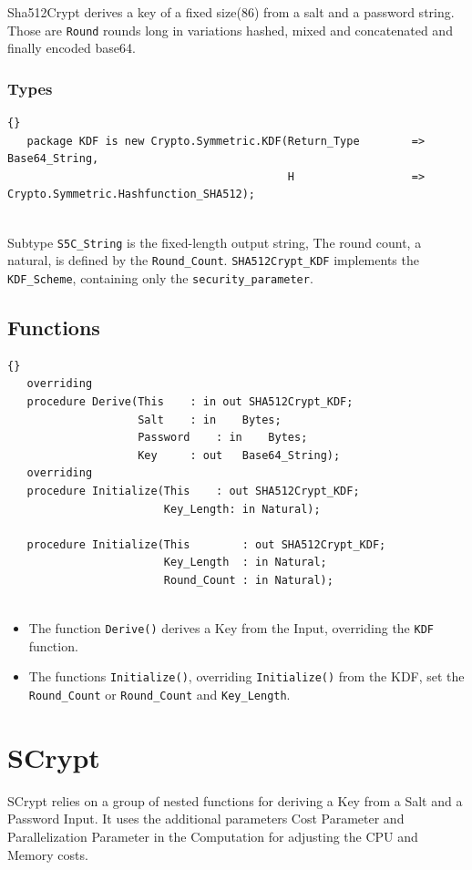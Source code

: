 Sha512Crypt derives a key of a fixed size(86) from a salt and a password string. Those are \texttt{Round\Count} rounds long in variations hashed, mixed and concatenated and finally encoded base64.
\subsubsection*{Types}
\begin{lstlisting}{}
   package KDF is new Crypto.Symmetric.KDF(Return_Type        => Base64_String,
                                           H                  => Crypto.Symmetric.Hashfunction_SHA512);


\end{lstlisting}
Subtype \texttt{S5C\_String} is the fixed-length output string, The round count, a natural, is defined by the \texttt{Round\_Count}. \texttt{SHA512Crypt\_KDF} implements the \texttt{KDF\_Scheme}, containing only the \texttt{security\_parameter}. 

\subsection*{Functions}
\begin{lstlisting}{}
   overriding
   procedure Derive(This	: in out SHA512Crypt_KDF;
                    Salt	: in 	Bytes;
                    Password	: in	Bytes;
                    Key		: out	Base64_String);
   overriding
   procedure Initialize(This	: out SHA512Crypt_KDF;
                        Key_Length: in Natural);

   procedure Initialize(This		: out SHA512Crypt_KDF;
                        Key_Length	: in Natural;
                        Round_Count	: in Natural);


\end{lstlisting}
\begin{itemize}
	\item The function \texttt{Derive()} derives a Key from the Input, overriding the \texttt{KDF} function.
	\item The functions \texttt{Initialize()}, overriding \texttt{Initialize()} from the KDF, set the \texttt{Round\_Count} or \texttt{Round\_Count} and \texttt{Key\_Length}.
\end{itemize}


\section{SCrypt}
SCrypt relies on a group of nested functions for deriving a Key from a Salt and a Password Input. It uses the additional parameters Cost Parameter and Parallelization Parameter in the Computation for adjusting the CPU and Memory costs.
